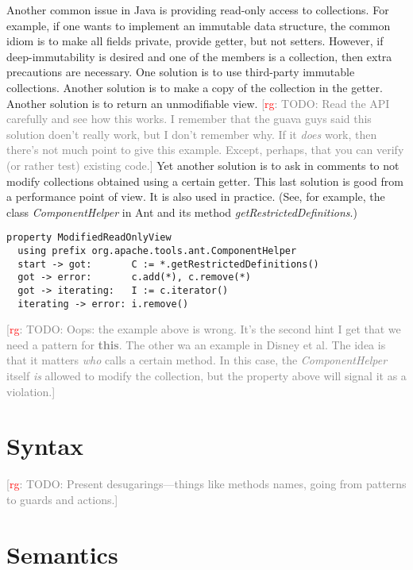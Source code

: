 \documentclass[preprint]{sigplanconf} %
\newcommand{\note}[2]{\textcolor{gray}{[\textcolor{red}{#1}: #2]}}
\newcommand{\rg}[1]{\note{rg}{#1}}
\theoremstyle{definition}
\begin{document}
Another common issue in Java is providing read-only access to collections.
For example, if one wants to implement an immutable data structure, the common idiom is to make all fields private, provide getter, but not setters.
However, if deep-immutability is desired and one of the members is a collection, then extra precautions are necessary.
One solution is to use third-party immutable collections.
Another solution is to make a copy of the collection in the getter.
Another solution is to return an unmodifiable view.
\rg{TODO: Read the API carefully and see how this works.
I remember that the guava guys said this solution doen't really work, but I don't remember why.
If it \emph{does} work, then there's not much point to give this example.
Except, perhaps, that you can verify (or rather test) existing code.}
Yet another solution is to ask in comments to not modify collections obtained using a certain getter.
This last solution is good from a performance point of view.
It is also used in practice.
(See, for example, the class \textit{ComponentHelper} in Ant and its method \textit{getRestrictedDefinitions}.)
\par\medskip\noindent
\begin{Verbatim}
property ModifiedReadOnlyView
  using prefix org.apache.tools.ant.ComponentHelper
  start -> got:       C := *.getRestrictedDefinitions()
  got -> error:       c.add(*), c.remove(*)
  got -> iterating:   I := c.iterator()
  iterating -> error: i.remove()
\end{Verbatim}
\par\medskip\noindent
\rg{TODO: Oops: the example above is wrong.
It's the second hint I get that we need a pattern for \textbf{this}.
The other wa an example in Disney et al.
The idea is that it matters \emph{who} calls a certain method.
In this case, the \textit{ComponentHelper} itself \emph{is} allowed to modify the collection, but the property above will signal it as a violation.}

\section{Syntax}\label{sec:syntax} %

\rg{TODO: Present desugarings---things like methods names, going from patterns to guards and actions.}

\section{Semantics}\label{sec:semantics} %
\end{document}
